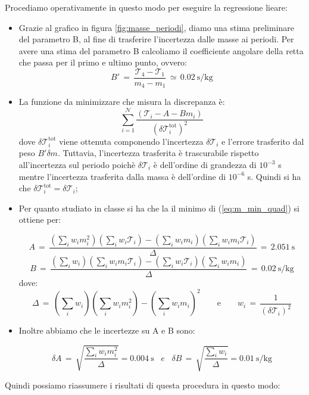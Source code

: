 Procediamo operativamente in questo modo per eseguire la regressione lieare:

\begin{itemize}
	\item{Grazie al grafico in figura \ref{fig:masse_periodi}, diamo una stima preliminare del parametro B, al fine di trasferire
        l'incertezza dalle masse ai periodi. Per avere una stima del parametro B calcoliamo il coefficiente angolare della retta che
        passa per il primo e ultimo punto, ovvero:
			\begin{equation*}
				B' \,=\, \frac{\mathcal{T}_4 - \mathcal{T}_1}{m_4 - m_1} \,\simeq\, \SI{0.02}{\second\per\kilo\gram}
			\end{equation*}
			}
	\item{La funzione da minimizzare che misura la discrepanza è:
			\begin{equation}
                \sum_{i=1}^{\mathcal{N}} \frac{(\mathcal{T}_i - A - B m_i)}{(\delta \mathcal{T}_i^\text{tot})^2}	
                \label{eq:m_min_quad}
			\end{equation}
            dove $\delta \mathcal{T}_i^\text{tot}$ viene ottenuta componendo
            l'incertezza $\delta \mathcal{T}_i$ e l'errore trasferito dal peso $B'\delta m$. Tuttavia, l'incertezza
            trasferita è trascurabile rispetto all'incertezza sul periodo poichè $\delta \mathcal{T}_i$ è dell'ordine di
            grandezza di $10^{-3}$ s mentre l'incertezza trasferita dalla massa è dell'ordine di $10^{-6}$ s.
            Quindi si ha che $\delta \mathcal{T}_i^\text{tot} = \delta \mathcal{T}_i$;}
	\item{Per quanto studiato in classe si ha che la il minimo di (\ref{eq:m_min_quad}) si ottiene per:

			\begin{equation*}
				A \,=\, \frac{(\sum_i w_i m_i^2)(\sum_i w_i \mathcal{T}_i) - (\sum_i w_i m_i)(\sum_i w_i m_i \mathcal{T}_i)}{\Delta}
                \,=\, \SI{2.051}{\second}
			\end{equation*}
			\begin{equation*}
				B \,=\, \frac{(\sum_i w_i)(\sum_i w_i m_i \mathcal{T}_i) - (\sum_i w_i \mathcal{T}_i)(\sum_i w_i m_i)}{\Delta}
                \,=\, \SI{0.02}{\second\per\kilo\gram}
			\end{equation*}
			dove:
			\begin{equation*}
				\Delta \,=\, (\sum_i w_i)(\sum_i w_i m_i^2) - (\sum_i w_i m_i)^2 \qquad \text{e} \qquad
				w_i \,=\, \frac{1}{(\delta \mathcal{T}_i)^2}
			\end{equation*}}
	\item{Inoltre abbiamo che le incertezze su A e B sono:

			\begin{equation*}
				\delta A \,=\, \sqrt{\frac{\sum_i w_i m_i^2}{\Delta}} = \SI{0.004}{\second}  \,\,\,\,\, e \,\,\,\,\,
				\delta B \,=\, \sqrt{\frac{\sum_i w_i}{\Delta}} = \SI{0.01}{\second\per\kilo\gram}
			\end{equation*}}
	\end{itemize} 
	Quindi possiamo riassumere i risultati di questa procedura in questo modo:


